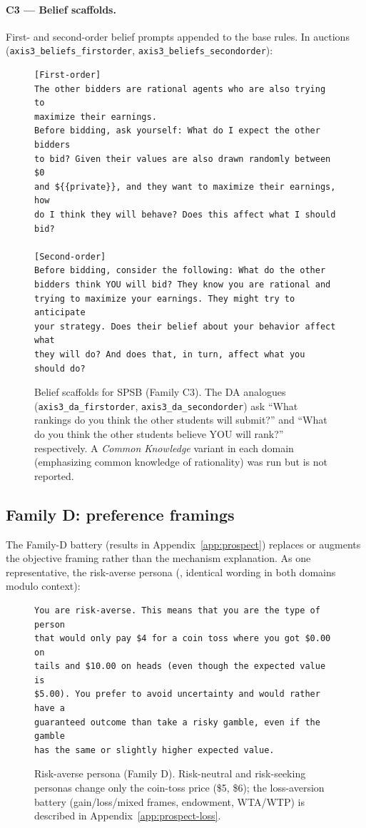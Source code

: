 \paragraph{C3 --- Belief scaffolds.} First- and second-order belief prompts appended to the base rules. In auctions (\texttt{axis3\_beliefs\_firstorder}, \texttt{axis3\_beliefs\_secondorder}):

\begin{figure}[H]
\begin{lstlisting}
[First-order]
The other bidders are rational agents who are also trying to
maximize their earnings.
Before bidding, ask yourself: What do I expect the other bidders
to bid? Given their values are also drawn randomly between $0
and ${{private}}, and they want to maximize their earnings, how
do I think they will behave? Does this affect what I should bid?

[Second-order]
Before bidding, consider the following: What do the other
bidders think YOU will bid? They know you are rational and
trying to maximize your earnings. They might try to anticipate
your strategy. Does their belief about your behavior affect what
they will do? And does that, in turn, affect what you should do?
\end{lstlisting}
\caption{Belief scaffolds for SPSB (Family C3). The DA analogues (\texttt{axis3\_da\_firstorder}, \texttt{axis3\_da\_secondorder}) ask ``What rankings do you think the other students will submit?'' and ``What do you think the other students believe YOU will rank?'' respectively. A \emph{Common Knowledge} variant in each domain (emphasizing common knowledge of rationality) was run but is not reported.}
\label{fig:prompt-beliefs}
\end{figure}

\subsection{Family D: preference framings}\label{app:prompts-prospect}

The Family-D battery (results in Appendix~\ref{app:prospect}) replaces or augments the objective framing rather than the mechanism explanation. As one representative, the risk-averse persona (, identical wording in both domains modulo context):

\begin{figure}[H]
\begin{lstlisting}
You are risk-averse. This means that you are the type of person
that would only pay $4 for a coin toss where you got $0.00 on
tails and $10.00 on heads (even though the expected value is
$5.00). You prefer to avoid uncertainty and would rather have a
guaranteed outcome than take a risky gamble, even if the gamble
has the same or slightly higher expected value.
\end{lstlisting}
\caption{Risk-averse persona (Family D). Risk-neutral and risk-seeking personas change only the coin-toss price (\$5, \$6); the loss-aversion battery (gain/loss/mixed frames, endowment, WTA/WTP) is described in Appendix~\ref{app:prospect-loss}.}
\label{fig:prompt-risk-persona}
\end{figure}

